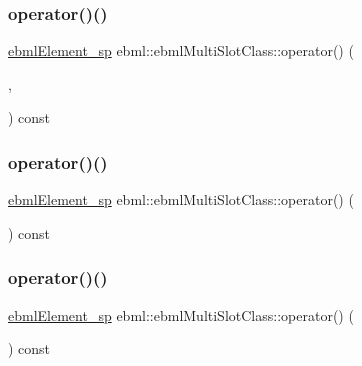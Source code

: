 \subsubsection{\texorpdfstring{operator()()}{operator()()}\hspace{0.1cm}{\footnotesize\ttfamily [3/6]}}
{\footnotesize\ttfamily \mbox{\hyperlink{namespaceebml_adad533b7705a16bb360fe56380c5e7be}{ebml\+Element\+\_\+sp}} ebml\+::ebml\+Multi\+Slot\+Class\+::operator() (\begin{DoxyParamCaption}\item[{const \mbox{\hyperlink{namespaceebml_ae432575dfbb3e141ce897442794f0ca5}{slot\+Arg\+\_\+l}} \&}]{,  }\item[{const \mbox{\hyperlink{namespaceebml_a4317d4c495715eced3ed448c2d05caeb}{slot\+Arg\+\_\+d}} \&}]{ }\end{DoxyParamCaption}) const}

\mbox{\label{classebml_1_1ebmlMultiSlotClass_ae62906b659277cc8de283a27a8bceed2}} 
\subsubsection{\texorpdfstring{operator()()}{operator()()}\hspace{0.1cm}{\footnotesize\ttfamily [4/6]}}
{\footnotesize\ttfamily \mbox{\hyperlink{namespaceebml_adad533b7705a16bb360fe56380c5e7be}{ebml\+Element\+\_\+sp}} ebml\+::ebml\+Multi\+Slot\+Class\+::operator() (\begin{DoxyParamCaption}\item[{\mbox{\hyperlink{namespaceebml_ae432575dfbb3e141ce897442794f0ca5}{slot\+Arg\+\_\+l}} \&\&}]{ }\end{DoxyParamCaption}) const}

\mbox{\label{classebml_1_1ebmlMultiSlotClass_aaba4e03050493237191b214950972295}} 
\subsubsection{\texorpdfstring{operator()()}{operator()()}\hspace{0.1cm}{\footnotesize\ttfamily [5/6]}}
{\footnotesize\ttfamily \mbox{\hyperlink{namespaceebml_adad533b7705a16bb360fe56380c5e7be}{ebml\+Element\+\_\+sp}} ebml\+::ebml\+Multi\+Slot\+Class\+::operator() (\begin{DoxyParamCaption}\item[{\mbox{\hyperlink{namespaceebml_a4317d4c495715eced3ed448c2d05caeb}{slot\+Arg\+\_\+d}} \&\&}]{ }\end{DoxyParamCaption}) const}

